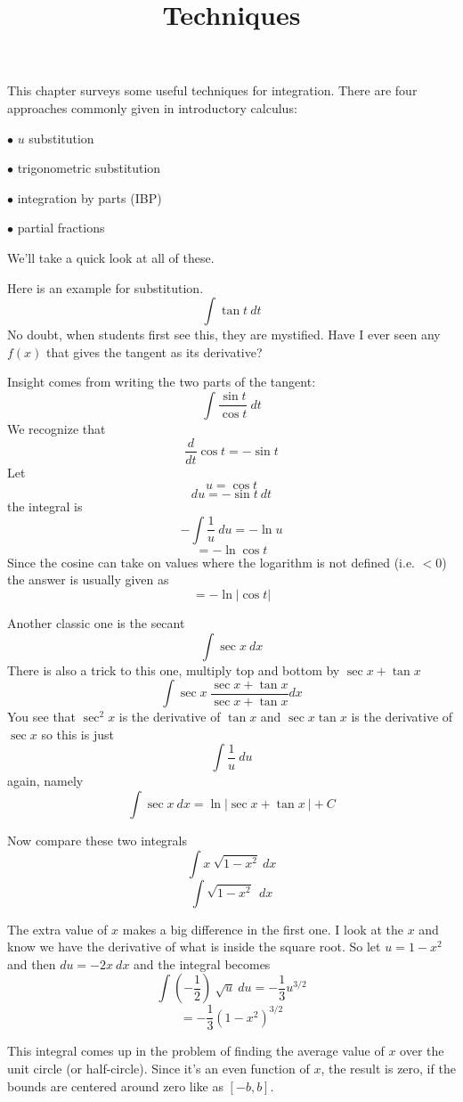 \documentclass[11pt, oneside]{article}
\title{Techniques}
\date{}
\begin{document}
\maketitle
\Large


\label{sec:Techniques_of_integration}

This chapter surveys some useful techniques for integration.  There are four approaches commonly given in introductory calculus:

$\bullet$ $u$ substitution

$\bullet$ trigonometric substitution

$\bullet$ integration by parts (IBP)

$\bullet$ partial fractions

We'll take a quick look at all of these.  

Here is an example for substitution.  
\[ \int \tan t \ dt \]
No doubt, when students first see this, they are mystified.  Have I ever seen any $f(x)$ that gives the tangent as its derivative?

Insight comes from writing the two parts of the tangent:
\[ \int \frac{\sin t}{\cos t} \ dt \]
We recognize that 
\[ \frac{d}{dt} \cos t = - \sin t  \]
Let
\[ u = \cos t \]
\[ du = - \sin t \ dt \]
the integral is
\[ - \int \frac{1}{u} \ du = - \ln u \]
\[ = - \ln \cos t \]
Since the cosine can take on values where the logarithm is not defined (i.e. $< 0$) the answer is usually given as
\[ = - \ln |\cos t| \]

Another classic one is the secant
\[ \int \sec x \ dx \]
There is also a trick to this one, multiply top and bottom by $\sec x + \tan x$
\[ \int \sec x \ \frac{\sec x + \tan x}{\sec x + \tan x} dx \]
You see that $\sec^2 x$ is the derivative of $\tan x$ and $\sec x \tan x$ is the derivative of $\sec x$ so this is just
\[  \int \frac{1}{u} \ du  \]
again, namely
\[ \int \sec x \ dx = \ln | \sec x +  \tan x \ | + C \]

Now compare these two integrals
\[ \int x \ \sqrt{1-x^2}  \ dx \]
\[ \int \sqrt{1-x^2} \ \ dx \]

The extra value of $x$ makes a big difference in the first one.  I look at the $x$ and know we have the derivative of what is inside the square root.  So let $u = 1-x^2$ and then $du = -2x \ dx$ and the integral becomes
\[ \int (- \frac{1}{2}) \ \sqrt{u} \ du = - \frac{1}{3} u^{3/2} \]
\[ =  - \frac{1}{3} (1-x^2)^{3/2} \]

This integral comes up in the problem of finding the average value of $x$ over the unit circle (or half-circle).  Since it's an even function of $x$, the result is zero, if the bounds are centered around zero like as $[-b,b]$.
\end{document}
